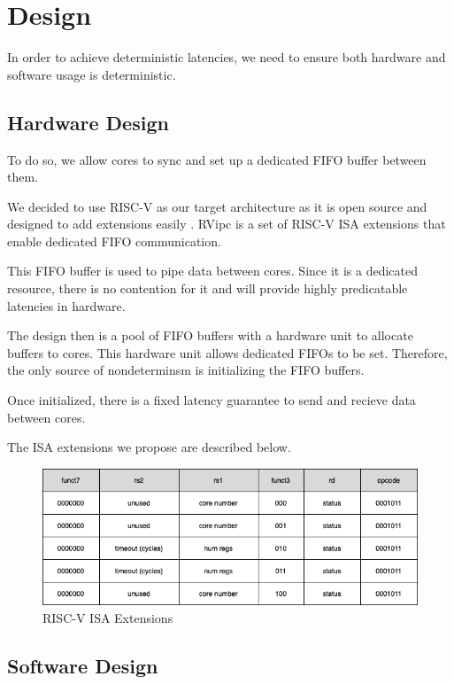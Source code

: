 \section{Design}

In order to achieve deterministic latencies, we need to ensure both hardware and software usage is deterministic. 

\subsection{Hardware Design}
To do so, we allow cores to sync and set up a dedicated FIFO buffer between them.

We decided to use RISC-V as our target architecture as it is open source and designed to add extensions easily \cite{Waterman:RISC-V:2019}. RVipc is a set of RISC-V ISA extensions that enable dedicated FIFO communication. 

This FIFO buffer is used to pipe data between cores. Since it is a dedicated resource, there is no contention for it and will provide highly predicatable latencies in hardware.

The design then is a pool of FIFO buffers with a hardware unit to allocate buffers to cores. This hardware unit allows dedicated FIFOs to be set. Therefore, the only source of nondeterminsm is initializing the FIFO buffers.

Once initialized, there is a fixed latency guarantee to send and recieve data between cores. 

The ISA extensions we propose are described below.

\begin{figure}[h]
  \centering
  \includegraphics[width=1\linewidth]{figures/isa.png}
  \caption{RISC-V ISA Extensions}
  \label{fig:isa_extensions}
\end{figure}

\subsection{Software Design}

